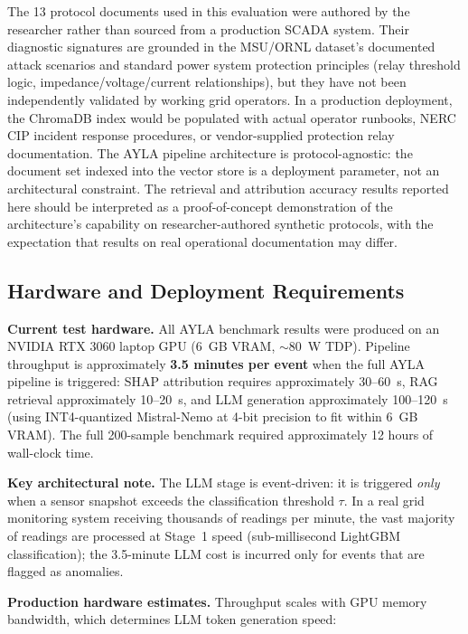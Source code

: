 \documentclass[twocolumn, 10pt, letterpaper]{article}
\begin{document}
The 13 protocol documents used in this evaluation were authored by the researcher
rather than sourced from a production SCADA system.
Their diagnostic signatures are grounded in the MSU/ORNL dataset's documented
attack scenarios \cite{morris2014ics} and standard power system protection
principles (relay threshold logic, impedance/voltage/current relationships),
but they have not been independently validated by working grid operators.
In a production deployment, the ChromaDB index would be populated with actual
operator runbooks, NERC CIP incident response procedures, or vendor-supplied
protection relay documentation.
The AYLA pipeline architecture is protocol-agnostic: the document set indexed
into the vector store is a deployment parameter, not an architectural constraint.
The retrieval and attribution accuracy results reported here should be interpreted
as a proof-of-concept demonstration of the architecture's capability on
researcher-authored synthetic protocols, with the expectation that results
on real operational documentation may differ.

\subsection{Hardware and Deployment Requirements}

\textbf{Current test hardware.} All AYLA benchmark results were produced on
an NVIDIA RTX 3060 laptop GPU (6~GB VRAM, $\sim$80~W TDP).
Pipeline throughput is approximately \textbf{3.5 minutes per event} when the
full AYLA pipeline is triggered: SHAP attribution requires approximately 30--60~s,
RAG retrieval approximately 10--20~s, and LLM generation approximately 100--120~s
(using INT4-quantized Mistral-Nemo at 4-bit precision to fit within 6~GB VRAM).
The full 200-sample benchmark required approximately 12 hours of wall-clock time.

\textbf{Key architectural note.} The LLM stage is event-driven: it is triggered
\textit{only} when a sensor snapshot exceeds the classification threshold $\tau$.
In a real grid monitoring system receiving thousands of readings per minute,
the vast majority of readings are processed at Stage~1 speed (sub-millisecond
LightGBM classification); the 3.5-minute LLM cost is incurred only for events
that are flagged as anomalies.

\textbf{Production hardware estimates.} Throughput scales with GPU memory
bandwidth, which determines LLM token generation speed:
\end{document}
